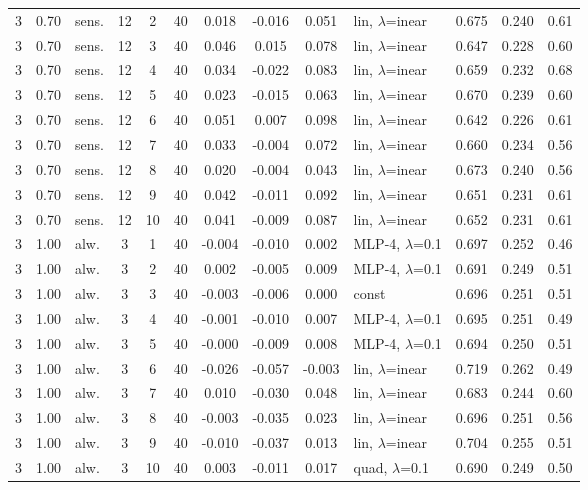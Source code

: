 \documentclass[10pt]{article}
\begin{document}
\begin{scriptsize}
\begin{longtable}{cclcc c ccc l ccc}
3 & 0.70 & sens. & 12 & 2 & 40 & 0.018 & -0.016 & 0.051 & lin, $\lambda$=inear & 0.675 & 0.240 & 0.61 \\
3 & 0.70 & sens. & 12 & 3 & 40 & 0.046 & 0.015 & 0.078 & lin, $\lambda$=inear & 0.647 & 0.228 & 0.60 \\
3 & 0.70 & sens. & 12 & 4 & 40 & 0.034 & -0.022 & 0.083 & lin, $\lambda$=inear & 0.659 & 0.232 & 0.68 \\
3 & 0.70 & sens. & 12 & 5 & 40 & 0.023 & -0.015 & 0.063 & lin, $\lambda$=inear & 0.670 & 0.239 & 0.60 \\
3 & 0.70 & sens. & 12 & 6 & 40 & 0.051 & 0.007 & 0.098 & lin, $\lambda$=inear & 0.642 & 0.226 & 0.61 \\
3 & 0.70 & sens. & 12 & 7 & 40 & 0.033 & -0.004 & 0.072 & lin, $\lambda$=inear & 0.660 & 0.234 & 0.56 \\
3 & 0.70 & sens. & 12 & 8 & 40 & 0.020 & -0.004 & 0.043 & lin, $\lambda$=inear & 0.673 & 0.240 & 0.56 \\
3 & 0.70 & sens. & 12 & 9 & 40 & 0.042 & -0.011 & 0.092 & lin, $\lambda$=inear & 0.651 & 0.231 & 0.61 \\
3 & 0.70 & sens. & 12 & 10 & 40 & 0.041 & -0.009 & 0.087 & lin, $\lambda$=inear & 0.652 & 0.231 & 0.61 \\
3 & 1.00 & alw. & 3 & 1 & 40 & -0.004 & -0.010 & 0.002 & MLP-4, $\lambda$=0.1 & 0.697 & 0.252 & 0.46 \\
3 & 1.00 & alw. & 3 & 2 & 40 & 0.002 & -0.005 & 0.009 & MLP-4, $\lambda$=0.1 & 0.691 & 0.249 & 0.51 \\
3 & 1.00 & alw. & 3 & 3 & 40 & -0.003 & -0.006 & 0.000 & const & 0.696 & 0.251 & 0.51 \\
3 & 1.00 & alw. & 3 & 4 & 40 & -0.001 & -0.010 & 0.007 & MLP-4, $\lambda$=0.1 & 0.695 & 0.251 & 0.49 \\
3 & 1.00 & alw. & 3 & 5 & 40 & -0.000 & -0.009 & 0.008 & MLP-4, $\lambda$=0.1 & 0.694 & 0.250 & 0.51 \\
3 & 1.00 & alw. & 3 & 6 & 40 & -0.026 & -0.057 & -0.003 & lin, $\lambda$=inear & 0.719 & 0.262 & 0.49 \\
3 & 1.00 & alw. & 3 & 7 & 40 & 0.010 & -0.030 & 0.048 & lin, $\lambda$=inear & 0.683 & 0.244 & 0.60 \\
3 & 1.00 & alw. & 3 & 8 & 40 & -0.003 & -0.035 & 0.023 & lin, $\lambda$=inear & 0.696 & 0.251 & 0.56 \\
3 & 1.00 & alw. & 3 & 9 & 40 & -0.010 & -0.037 & 0.013 & lin, $\lambda$=inear & 0.704 & 0.255 & 0.51 \\
3 & 1.00 & alw. & 3 & 10 & 40 & 0.003 & -0.011 & 0.017 & quad, $\lambda$=0.1 & 0.690 & 0.249 & 0.50 \\

\end{longtable}
\end{scriptsize}
\end{document}
